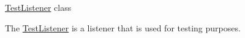 \mbox{\hyperlink{classCore_1_1Listeners_1_1TestListener}{Test\+Listener}} class

The \mbox{\hyperlink{classCore_1_1Listeners_1_1TestListener}{Test\+Listener}} is a listener that is used for testing purposes. 